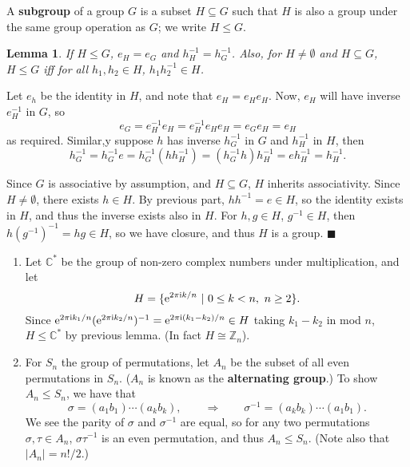 \documentclass[letter-paper]{tufte-book}
\newtheorem{lemma}[theorem]{\color{pastel-blue}Lemma}
\newenvironment{proof}[1][Proof]{\begin{trivlist}
\item[\hskip \labelsep {\bfseries #1}]}{\end{trivlist}}
\newenvironment{example}[1][Example]{\begin{trivlist}
\item[\hskip \labelsep {\bfseries #1}]}{\end{trivlist}}
\newcommand{\ex}{\mathrm{e}}
\newcommand{\zi}{{\rm i}}
\newcommand\Def[1]{\textbf{#1}}
\newcommand{\qed}{\hfill$\blacksquare$}
\begin{document}
A \Def{subgroup} of a group $G$ is a subset $H\subseteq G$ such that $H$ 
is also a group under the same group operation as $G$; we write $H\leq G$.
\begin{lemma}
  If $H\leq G$, $e_H=e_G$ and $h^{-1}_H=h^{-1}_G$. Also, for $H\neq\emptyset$ 
  and $H\subseteq G$, $H\leq G$ iff for all $h_1,h_2 \in H$, $h_1 h_2^{-1}
  \in H$.
\end{lemma}
\begin{proof}
  Let $e_h$ be the identity in $H$, and note that $e_H = e_H e_H$. Now, $e_H$ 
  will have inverse $e_H^{-1}$ in $G$, so
  \begin{equation*}
    e_G = e_H^{-1} e_H = e_H^{-1} e_H e_H = e_G e_H = e_H
  \end{equation*}
  as required. Similar,y suppose $h$ has inverse $h^{-1}_G$ in $G$ and 
  $h^{-1}_H$ in $H$, then
  \begin{equation*}
    h^{-1}_G=h^{-1}_G e=h^{-1}_G(h h^{-1}_H) = (h^{-1}_G h) h^{-1}_H =
    e h^{-1}_H = h^{-1}_H.
  \end{equation*}
  
  Since $G$ is associative by assumption, and $H\subseteq G$, $H$ inherits 
  associativity. Since $H\neq\emptyset$, there exists $h\in H$. By previous 
  part, $h h^{-1}=e\in H$, so the identity exists in $H$, and thus the inverse 
  exists also in $H$. For $h,g\in H$, $g^{-1}\in H$, then $h(g^{-1})^{-1}=
  hg\in H$, so we have closure, and thus $H$ is a group. \qed
\end{proof}

\begin{example}
  \begin{enumerate}
    \item Let $\mathbb{C}^*$ be the group of non-zero complex numbers under 
    multiplication, and let
    \begin{equation*}
      H=\{\ex^{2\pi\zi k/n}\ |\ 0\leq k<n,\ n\geq 2\}.
    \end{equation*}
    Since $\ex^{2\pi\zi k_1/n}(\ex^{2\pi\zi k_2/n})^{-1}=
    \ex^{2\pi\zi(k_1 - k_2)/n}\in H$ taking $k_1 - k_2$ in mod $n$, 
    $H\leq\mathbb{C}^*$ by previous lemma. (In fact $H\cong\mathbb{Z}_n$).
    
    \item For $S_n$ the group of permutations, let $A_n$ be the subset of all 
    even permutations in $S_n$. ($A_n$ is known as the \Def{alternating 
    group}.) To show $A_n\leq S_n$, we have that
    \begin{equation*}
      \sigma=(a_1 b_1)\cdots(a_k b_k),\qquad\Rightarrow\qquad
      \sigma^{-1}=(a_k b_k)\cdots(a_1 b_1).
    \end{equation*}
    We see the parity of $\sigma$ and $\sigma^{-1}$ are equal, so for any two 
    permutations $\sigma,\tau\in A_n$, $\sigma\tau^{-1}$ is an even permutation, 
    and thus $A_n\leq S_n$. (Note also that $|A_n|=n!/2$.)
  \end{enumerate}
\end{example}
\end{document}
